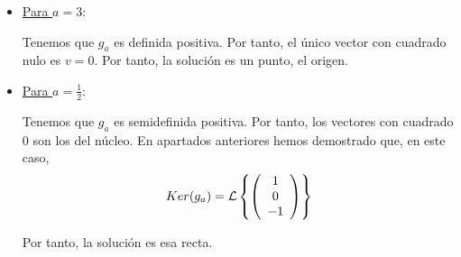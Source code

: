 \begin{ejercicio}
\begin{enumerate}
        \begin{itemize}
            \item \underline{Para $a=3$}:

            Tenemos que $g_a$ es definida positiva. Por tanto, el único vector con cuadrado nulo es $v=0$. Por tanto, la solución es un punto, el origen.

            \item \underline{Para $a=\frac{1}{2}$}:

            Tenemos que $g_a$ es semidefinida positiva. Por tanto, los vectores con cuadrado $0$ son los del núcleo. En apartados anteriores hemos demostrado que, en este caso,
            \begin{equation*}
                    Ker(g_a) = \mathcal{L}\left\{\left(\begin{array}{c}
                        1 \\ 0 \\ -1
                    \end{array}\right)\right\}
            \end{equation*}

            Por tanto, la solución es esa recta.
        \end{itemize}
        
    \end{enumerate}
\end{ejercicio}

